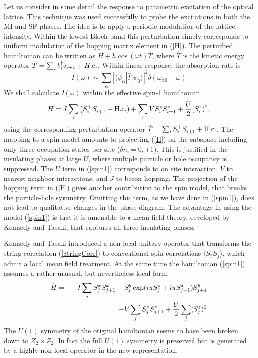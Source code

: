 \documentclass[prb,twocolumn,,amsmath,amssymb,floatfix]{revtex4}
\newcommand{\be}{\begin{equation}}
\newcommand{\ee}{\end{equation}}
\def \be{\begin{equation}}
\def \ee{\end{equation}}
\def \bea{\begin{eqnarray}}
\def \eea{\end{eqnarray}}
\def \nn{\nonumber}
\def \d{{\delta}}
\def \w{{\omega}}
\def \nd{{^{\vphantom{\dagger}}}}
\def \yd{^\dagger}
\def \av#1{{\langle#1\rangle}}
\begin{document}
Let us consider in some detail the response to
parametric excitation of the optical lattice. This technique was
used successfully to probe the excitations in both the MI and SF
phases\cite{Esslinger}. The idea is to apply a periodic modulation
of the lattice intensity. Within the lowest Bloch band this
perturbation simply corresponds to uniform modulation of the
hopping matrix element in (\ref{H}). The perturbed hamiltonian can
be written as $H+h \cos(\w t)\hat T$, where $\hat T$ is the
kinetic energy operator ${\hat T}=\sum_i b\yd_i b\nd_{i+1}+H.{\rm
c}.$. Within linear response, the absorption rate is
\be I(\w)\sim
\sum_\alpha \left|\langle \psi_\alpha | \hat{T} | \psi_0 \rangle
\right|^2\delta(\w_{\alpha0} - \w) \label{Iw}
\ee
We shall
calculate $I(\w)$ within the effective spin-1 hamiltonian
\be
H=J\sum_{i}\left(S^+_iS^-_{i+1}+{\mbox H.{\rm c}.}\right)+\sum_i
VS^z_i S^z_{i+1} +{U\over 2}(S^z_i)^2, \label{spin1}
\ee
using the
corresponding perturbation operator ${\hat T}=\sum_i
S^+_iS^-_{i+1}+{\mbox H.{\rm c}.}$. The mapping to a spin model
amounts to projecting (\ref{H}) on the subspace including only
three occupation states per site ($\d n_i=0,\pm 1$). This is
justified in the insulating phases at large $U$, where multiple
particle or hole occupancy is suppressed. The
$U$ term in
(\ref{spin1}) corresponds to on site interaction, $V$ to nearest
neighbor interactions, and $J$ to boson hopping. The
projection of the hoppnig term in (\ref{H}) gives another
contribution to the spin model, that breaks the particle-hole
symmetry. Omitting this term, as we have done in (\ref{spin1}),
does not lead to qualitative changes in the phase diagram.
The advantage in using the model
(\ref{spin1}) is that it is amenable to a mean field theory,
developed by Kennedy and Tasaki\cite{KennedyTasaki}, that captures
all three insulating phases.

Kennedy and Tasaki introduced a non local unitary operator that
transforms the string correlation (\ref{StringCorr}) to
conventional spin correlations $\av{S^z_iS^z_j}$, which admit a
local mean field treatment. At the same time the hamiltonian
(\ref{spin1}) assumes a rather unusual, but nevertheless local form:
\bea \tilde{H} &=&-J\sum_{j} S^x_{j} S^x_{j+1} - S^y_{j} \exp(i \pi
S^z_j + i \pi S^x_{j+1})
S^y_{j+1} \nn\\
&&- V\sum_{j} {S}^{z}_j {S}^{z}_{j+1} + {U\over 2} \sum_j (
{S}^{z}_j)^2 \label{Htilde} \eea
The $U(1)$ symmetry of the original
hamiltonian seems to have been broken down to $Z_2\times Z_2$. In
fact the full $U(1)$ symmetry is preserved but is generated by a
highly non-local operator in the new representation.
\end{document}
